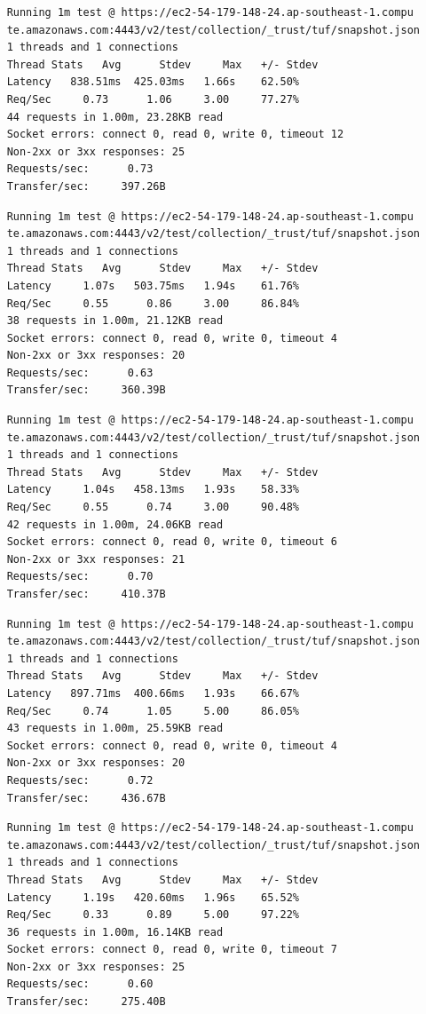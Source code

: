 \documentclass[a4paper,12pt]{article}
\newcounter{subsubsubsection}[subsubsection]
\begin{document}
{{	
	\begin{verbatim}
	Running 1m test @ https://ec2-54-179-148-24.ap-southeast-1.compu
	te.amazonaws.com:4443/v2/test/collection/_trust/tuf/snapshot.json
	1 threads and 1 connections
	Thread Stats   Avg      Stdev     Max   +/- Stdev
	Latency   838.51ms  425.03ms   1.66s    62.50%
	Req/Sec     0.73      1.06     3.00     77.27%
	44 requests in 1.00m, 23.28KB read
	Socket errors: connect 0, read 0, write 0, timeout 12
	Non-2xx or 3xx responses: 25
	Requests/sec:      0.73
	Transfer/sec:     397.26B
	\end{verbatim}
	\begin{verbatim}
	Running 1m test @ https://ec2-54-179-148-24.ap-southeast-1.compu
	te.amazonaws.com:4443/v2/test/collection/_trust/tuf/snapshot.json
	1 threads and 1 connections
	Thread Stats   Avg      Stdev     Max   +/- Stdev
	Latency     1.07s   503.75ms   1.94s    61.76%
	Req/Sec     0.55      0.86     3.00     86.84%
	38 requests in 1.00m, 21.12KB read
	Socket errors: connect 0, read 0, write 0, timeout 4
	Non-2xx or 3xx responses: 20
	Requests/sec:      0.63
	Transfer/sec:     360.39B
	\end{verbatim}
	\begin{verbatim}
	Running 1m test @ https://ec2-54-179-148-24.ap-southeast-1.compu
	te.amazonaws.com:4443/v2/test/collection/_trust/tuf/snapshot.json
	1 threads and 1 connections
	Thread Stats   Avg      Stdev     Max   +/- Stdev
	Latency     1.04s   458.13ms   1.93s    58.33%
	Req/Sec     0.55      0.74     3.00     90.48%
	42 requests in 1.00m, 24.06KB read
	Socket errors: connect 0, read 0, write 0, timeout 6
	Non-2xx or 3xx responses: 21
	Requests/sec:      0.70
	Transfer/sec:     410.37B
	\end{verbatim}
	\newpage
	\begin{verbatim}
	Running 1m test @ https://ec2-54-179-148-24.ap-southeast-1.compu
	te.amazonaws.com:4443/v2/test/collection/_trust/tuf/snapshot.json
	1 threads and 1 connections
	Thread Stats   Avg      Stdev     Max   +/- Stdev
	Latency   897.71ms  400.66ms   1.93s    66.67%
	Req/Sec     0.74      1.05     5.00     86.05%
	43 requests in 1.00m, 25.59KB read
	Socket errors: connect 0, read 0, write 0, timeout 4
	Non-2xx or 3xx responses: 20
	Requests/sec:      0.72
	Transfer/sec:     436.67B
	\end{verbatim}
	\begin{verbatim}
	Running 1m test @ https://ec2-54-179-148-24.ap-southeast-1.compu
	te.amazonaws.com:4443/v2/test/collection/_trust/tuf/snapshot.json
	1 threads and 1 connections
	Thread Stats   Avg      Stdev     Max   +/- Stdev
	Latency     1.19s   420.60ms   1.96s    65.52%
	Req/Sec     0.33      0.89     5.00     97.22%
	36 requests in 1.00m, 16.14KB read
	Socket errors: connect 0, read 0, write 0, timeout 7
	Non-2xx or 3xx responses: 25
	Requests/sec:      0.60
	Transfer/sec:     275.40B
	\end{verbatim}
	\newpage
	
}}
\end{document}
